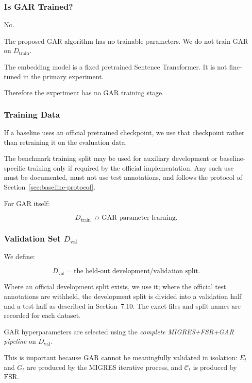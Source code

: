 \documentclass[11pt,a4paper]{article}
\begin{document}
\subsubsection{Is GAR Trained?}

No.

The proposed GAR algorithm has no trainable parameters. We do not train GAR on $D_{\mathrm{train}}$.

The embedding model is a fixed pretrained Sentence Transformer. It is not fine-tuned in the primary experiment.

Therefore the experiment has no GAR training stage.

\subsubsection{Training Data}

If a baseline uses an official pretrained checkpoint, we use that checkpoint rather than retraining it on the evaluation data.

The benchmark training split may be used for auxiliary development or baseline-specific training only if required by the official implementation. Any such use must be documented, must not use test annotations, and follows the protocol of Section~\ref{sec:baseline-protocol}.

For GAR itself:

\[
D_{\mathrm{train}}
\not\rightarrow
\text{GAR parameter learning}.
\]

\subsubsection{Validation Set $D_{\mathrm{val}}$}

We define:

\[
\boxed{D_{\mathrm{val}}=\text{the held-out development/validation split}.}
\]

Where an official development split exists, we use it; where the official test annotations are withheld, the development split is divided into a validation half and a test half as described in Section~7.10. The exact files and split names are recorded for each dataset.

GAR hyperparameters are selected using the \emph{complete MIGRES+FSR+GAR pipeline} on $D_{\mathrm{val}}$.

This is important because GAR cannot be meaningfully validated in isolation: $E_t$ and $G_t$ are produced by the MIGRES iterative process, and $\mathcal{C}_t$ is produced by $\mathrm{FSR}$.
\end{document}
